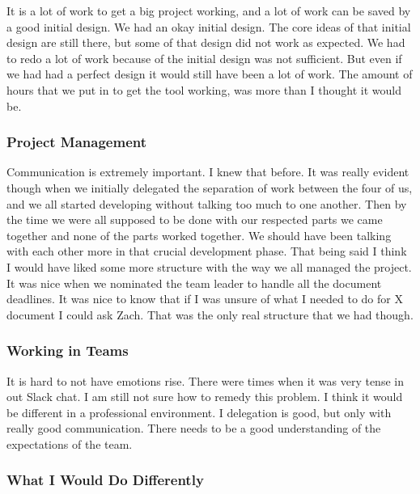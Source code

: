\documentclass[letterpaper,10pt,titlepage,draftclsnofoot,onecolumn,onesided] {IEEEtran}
\begin{document}
It is a lot of work to get a big project working, and a lot of work can be saved by a good initial design.
We had an okay initial design. 
The core ideas of that initial design are still there, but some of that design did not work as expected. 
We had to redo a lot of work because of the initial design was not sufficient.
But even if we had had a perfect design it would still have been a lot of work. 
The amount of hours that we put in to get the tool working, was more than I thought it would be. \\

\subsubsection{Project Management}

Communication is extremely important. 
I knew that before.
It was really evident though when we initially delegated the separation of work between the four of us, and we all started developing without talking too much to one another. 
Then by the time we were all supposed to be done with our respected parts we came together and none of the parts worked together. 
We should have been talking with each other more in that crucial development phase.
That being said
I think I would have liked some more structure with the way we all managed the project. 
It was nice when we nominated the team leader to handle all the document deadlines.
It was nice to know that if I was unsure of what I needed to do for X document I could ask Zach.
That was the only real structure that we had though. \\	

\subsubsection{Working in Teams}

It is hard to not have emotions rise.
There were times when it was very tense in out Slack chat. 
I am still not sure how to remedy this problem.
I think it would be different in a professional environment.
I delegation is good, but only with really good communication.
There needs to be a good understanding of the expectations of the team. \\
 
\subsubsection{What I Would Do Differently}
\end{document}

